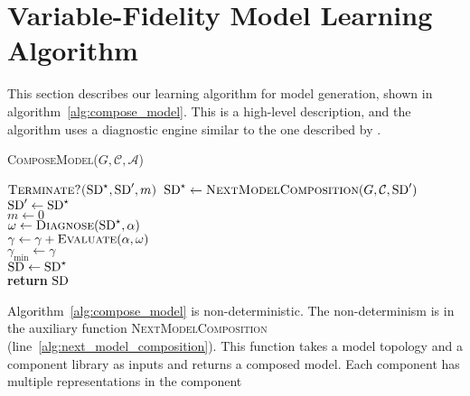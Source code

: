 \section{Variable-Fidelity Model Learning Algorithm}
%
This section describes our learning algorithm for model generation,
shown in
algorithm~\ref{alg:compose_model}. This is a high-level description,
and the algorithm uses a diagnostic engine similar to the one
described by \cite{feldman13genius}.
%
\begin{algorithm}[htb]
\begin{footnotesize}
%
\caption{\textsc{ComposeModel}($G, \mathcal{C}, \mathcal{A}$)}
\label{alg:compose_model}
%
%
%
\vspace{0.075in}
%
\Repeat
{
$\textsc{Terminate?($\mathrm{SD}^\star, \mathrm{SD}^\prime, m$)}$
}
{
    $\mathrm{SD}^\star \gets \textsc{NextModelComposition}(G, \mathcal{C}, \mathrm{SD}^\prime)$\label{alg:next_model_composition}\\
    $\mathrm{SD}^\prime \gets \mathrm{SD}^\star$\\
    $m \gets 0$\\
    {
        $\omega \gets \textsc{Diagnose}(\mathrm{SD}^\star, \alpha)$\label{alg:diagnose}\\
        $\gamma \gets \gamma + \textsc{Evaluate}(\alpha, \omega)$\label{alg:evaluate}\\
    }
    \If{$\gamma < \gamma_{\min}$\label{alg:accept_start}}
    {
        $\gamma_{\min} \gets \gamma$\\
        $\mathrm{SD} \gets \mathrm{SD}^\star$\label{alg:accept_end}\\
    }
}
\textbf{return} $\mathrm{SD}$
%
\end{footnotesize}
\end{algorithm}
%
\par
%
Algorithm~\ref{alg:compose_model} is non-deterministic. The
non-determinism is in the auxiliary function
\textsc{NextModelComposition}
(line~\ref{alg:next_model_composition}). This function takes a model
topology and a component library as inputs and returns a composed
model. Each component has multiple representations in the component
